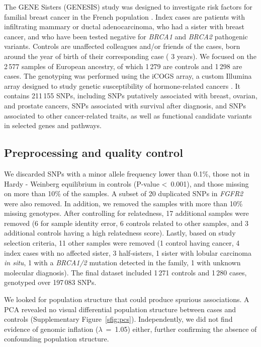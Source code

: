 \documentclass[twocolumn, 11pt]{article}
\begin{document}
The GENE Sisters (GENESIS) study was designed to investigate risk factors for familial breast cancer in the French population \cite{sinilnikova_genesis:_2016}. Index cases are patients with infiltrating mammary or ductal adenocarcinoma, who had a sister with breast cancer, and who have been tested negative for \emph{BRCA1} and \emph{BRCA2} pathogenic variants. Controls are unaffected colleagues and/or friends of the cases, born around the year of birth of their corresponding case (\textpm{} 3 years). We focused on the 2\,577 samples of European ancestry, of which 1\,279 are controls and 1\,298 are cases. The genotyping was performed using the iCOGS array, a custom Illumina array designed to study genetic susceptibility of hormone-related cancers \cite{sakoda_turning_2013}. It contains 211\,155 SNPs, including SNPs putatively associated with breast, ovarian, and prostate cancers, SNPs associated with survival after diagnosis, and SNPs associated to other cancer-related traits, as well as functional candidate variants in selected genes and pathways.

\subsection{Preprocessing and quality control}

We discarded SNPs with a minor allele frequency lower than 0.1\%, those not in Hardy - Weinberg equilibrium in controls (P-value \textless~0.001), and those missing on more than 10\% of the samples. A subset of 20 duplicated SNPs in \emph{FGFR2} were also removed. In addition, we removed the samples with more than 10\% missing genotypes. After controlling for relatedness, 17 additional samples were removed (6 for sample identity error, 6 controls related to other samples, and 3 additional controls having a high relatedness score). Lastly, based on study selection criteria, 11 other samples were removed (1 control having cancer, 4 index cases with no affected sister, 3 half-sisters, 1 sister with lobular carcinoma \emph{in situ}, 1 with a \emph{BRCA1/2} mutation detected in the family, 1 with unknown molecular diagnosis). The final dataset included 1\,271 controls and 1\,280 cases, genotyped over 197\,083 SNPs. 

We looked for population structure that could produce spurious associations. A PCA revealed no visual differential population structure between cases and controls (Supplementary Figure~\ref{sfig:pcs}). Independently, we did not find evidence of genomic inflation (\(\lambda\)~=~1.05) either, further confirming the absence of confounding population structure.
\end{document}
